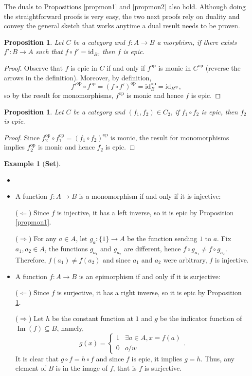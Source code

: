 \documentclass{article}
\newtheorem{prop}[thm]{Proposition}
\theoremstyle{definition}
\newtheorem{exmp}[thm]{Example}
\theoremstyle{remark}
\DeclareMathOperator{\im}{Im}
\newcommand{\id}{\text{id}}
\newcommand{\op}[1]{#1^{\text{op}}}
\begin{document}
The duals to Propositions \ref{propmon1} and \ref{propmon2} also hold. Although doing the straightforward proofs is very easy, the two next proofs rely on duality and convey the general sketch that works anytime a dual result needs to be proven.
\begin{prop}\label{propep1}
	Let $C$ be a category and $f:A\rightarrow B$ a morphism, if there exists $f': B\rightarrow A$ such that $f\circ f' = \id_B$, then $f$ is epic.
\end{prop}
\begin{proof}
	Observe that $f$ is epic in $C$ if and only if $\op{f}$ is monic in $\op{C}$ (reverse the arrows in the definition). Moreover, by definition, \[\op{f'} \circ \op{f} = \op{(f \circ f')} = \op{\id_B} = \id_{\op{B}},\] so by the result for monomorphisms, $\op{f}$ is monic and hence $f$ is epic. 
\end{proof}
\begin{prop}
	Let $C$ be a category and $(f_1, f_2) \in C_2$, if $f_1 \circ f_2$ is epic, then $f_2$ is epic.
\end{prop}
\begin{proof}
	Since $\op{f_2} \circ \op{f_1} = \op{(f_1 \circ f_2)}$ is monic, the result for monomorphisms implies $\op{f_2}$ is monic and hence $f_2$ is epic.
\end{proof}
\begin{exmp}[\textbf{Set}]
	\begin{itemize}
		\item[]
		\item A function $f:A\rightarrow B$ is a monomorphism if and only if it is injective:
		
		($\Leftarrow$) Since $f$ is injective, it has a left inverse, so it is epic by Proposition \ref{propmon1}.
		
		($\Rightarrow$) For any $a \in A$, let $g_a: \{1\} \rightarrow A$ be the function sending $1$ to $a$. Fix $a_1, a_2 \in A$, the functions $g_{a_1}$ and $g_{a_2}$ are different, hence $f \circ g_{a_1} \neq f \circ g_{a_2}$. Therefore, $f(a_1) \neq f(a_2)$ and since $a_1$ and $a_2$ were arbitrary, $f$ is injective.
		
		\item A function $f:A\rightarrow B$ is an epimorphism if and only if it is surjective:
		
		($\Leftarrow$) Since $f$ is surjective, it has a right inverse, so it is epic by Proposition \ref{propep1}.
		
		($\Rightarrow$) Let $h$ be the constant function at $1$ and $g$ be the indicator function of $\im(f) \subseteq B$, namely, \[g(x) = \begin{cases}1&\exists a \in A, x = f(a)\\0&o/w\end{cases}.\]
		It is clear that $g \circ f = h\circ f$ and since $f$ is epic, it implies $g = h$. Thus, any element of $B$ is in the image of $f$, that is $f$ is surjective.
	\end{itemize}
\end{exmp}
\end{document}
